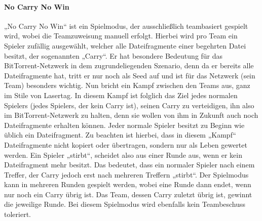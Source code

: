 \paragraph{No Carry No Win}
„No Carry No Win“ ist ein Spielmodus, der ausschließlich teambasiert gespielt wird, wobei die Teamzuweisung manuell erfolgt. Hierbei wird pro Team ein Spieler zufällig ausgewählt, welcher alle Dateifragmente einer begehrten Datei besitzt, der sogenannten „Carry“. Er hat besondere Bedeutung für das BitTorrent-Netzwerk in dem zugrundeliegenden Szenario, denn da er bereits alle Dateifragmente hat, tritt er nur noch als Seed auf und ist für das Netzwerk (sein Team) besonders wichtig. Nun bricht ein Kampf zwischen den Teams aus, ganz im Stile von Lasertag. In diesem Kampf ist folglich das Ziel jedes normalen Spielers (jedes Spielers, der kein Carry ist), seinen Carry zu verteidigen, ihn also im BitTorrent-Netzwerk zu halten, denn sie wollen von ihm in Zukunft auch noch Dateifragmente erhalten können.
Jeder normale Spieler besitzt zu Beginn wie üblich ein Dateifragment. Zu beachten ist hierbei, dass in diesem „Kampf“ Dateifragmente nicht kopiert oder übertragen, sondern nur als Leben gewertet werden. Ein Spieler „stirbt“, scheidet also aus einer Runde aus, wenn er kein Dateifragment mehr besitzt. Das bedeutet, dass ein normaler Spieler nach einem Treffer, der Carry jedoch erst nach mehreren Treffern „stirbt“. Der Spielmodus kann in mehreren Runden gespielt werden, wobei eine Runde dann endet, wenn nur noch ein Carry übrig ist. Das Team, dessen Carry zuletzt übrig ist, gewinnt die jeweilige Runde.
Bei diesem Spielmodus wird ebenfalls kein Teambeschuss toleriert.

